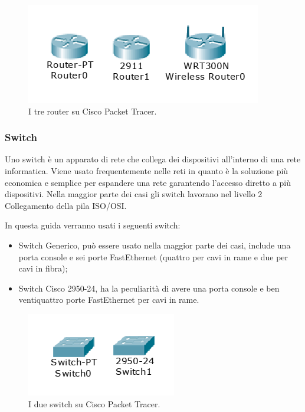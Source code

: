\begin{figure}[htbp]
    \centerline{\includegraphics[scale=.5]{images/02.packet-tracer/router.png}}
    \caption{I tre router su Cisco Packet Tracer.}
\end{figure}

\subsubsection{Switch}
Uno switch è un apparato di rete che collega dei dispositivi all'interno di una rete informatica. Viene usato frequentemente nelle reti in quanto è la soluzione più economica e semplice per espandere una rete garantendo l'accesso diretto a più dispositivi. Nella maggior parte dei casi gli switch lavorano nel livello 2 Collegamento della pila ISO/OSI.

\smallskip

\noindent In questa guida verranno usati i seguenti switch:

\begin{itemize}
    \item Switch Generico, può essere usato nella maggior parte dei casi, include una porta console e sei porte FastEthernet (quattro per cavi in rame e due per cavi in fibra);
    \item Switch Cisco 2950-24, ha la peculiarità di avere una porta console e ben ventiquattro porte FastEthernet per cavi in rame.
\end{itemize}

\begin{figure}[htbp]
    \centerline{\includegraphics[scale=.5]{images/02.packet-tracer/switch.png}}
    \caption{I due switch su Cisco Packet Tracer.}
\end{figure}

